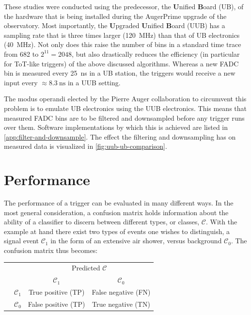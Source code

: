 These studies were conducted using the predecessor, the \textbf{U}nified \textbf{B}oard (UB), of the hardware that is being installed during the AugerPrime upgrade 
of the observatory. Most importantly, the \textbf{U}pgraded \textbf{U}nified \textbf{B}oard (UUB) has a sampling rate that is three times larger
(\SI{120}{\mega\hertz}) than that of UB electronics (\SI{40}{\mega\hertz}). Not only does this raise the number of bins in a standard time trace from 682 to 
$2^{11} = 2048$, but also drastically reduces the efficiency (in particular for ToT-like triggers) of the above discussed algorithms. Whereas a new FADC bin is 
measured every \SI{25}{\nano\second} in a UB station, the triggers would receive a new input every $\approx\SI{8.3}{\nano\second}$ in a UUB setting.

The modus operandi elected by the Pierre Auger collaboration to circumvent this problem is to emulate UB electronics using the UUB electronics. This means that 
measured FADC bins are to be filtered and downsampled before any trigger runs over them. Software implementations by which this is achieved are listed in 
\autoref{app:filter-and-downsample}. The effect the filtering and downsampling has on measured data is visualized in \autoref{fig:uub-ub-comparison}. 


\section{Performance}
\label{sec:classical-triggers-performance}

The performance of a trigger can be evaluated in many different ways. In the most general consideration, a confusion matrix holds information about the ability of 
a classifier to discern between different types, or classes, $\mathcal{C}$. With the example at hand there exist two types of events one wishes to distinguish, a 
signal event $\mathcal{C}_1$ in the form of an extensive air shower, versus background $\mathcal{C}_0$. The confusion matrix thus becomes:

\begingroup
\renewcommand{\arraystretch}{1.5}
\begin{center}
	\begin{tabular}{@{}cc c|c@{}}
		\multicolumn{1}{c}{} &\multicolumn{1}{c}{} &\multicolumn{2}{c}{\scriptsize Predicted $\mathcal{C}$ \normalsize} \\ 
		\multicolumn{1}{c}{} & 
		\multicolumn{1}{c}{} & 
		\multicolumn{1}{c}{$\mathcal{C}_1$} & 
		\multicolumn{1}{c}{$\mathcal{C}_0$} \\ 
		\cline{2-4}
		\multirow[c]{2}{*}{\rotatebox[origin=tr]{90}{\scriptsize True $\mathcal{C}$ \normalsize}}
		& $\mathcal{C}_1$  & True positive (TP) & False negative (FN)   \\
		\cline{3-4}
		& $\mathcal{C}_0$  & False positive (TP) & True negative (TN) \\ 
		\cline{2-4}
	\end{tabular}
\end{center}
\endgroup

